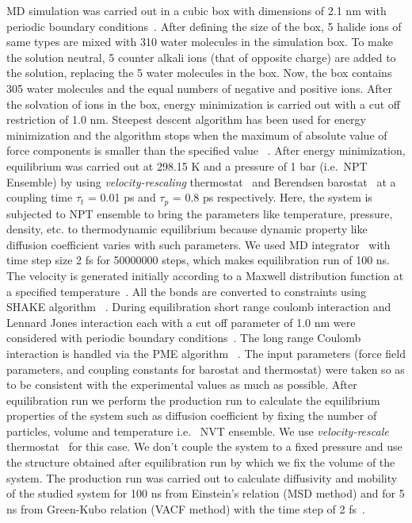 MD simulation was carried out in a cubic box with dimensions of 2.1 nm with periodic boundary 
conditions~\citep{Allen1989}. After defining the size of the box, 5 halide ions of same types are mixed with  310 water molecules in the  simulation box. To make the solution neutral, 5 counter alkali ions (that of opposite charge) are added to the solution, replacing the 5 water molecules in the box. Now, the box contains 305 water molecules and the equal numbers of negative and positive ions. After the solvation of ions in the box,  energy minimization is carried out with a cut off restriction of 1.0 nm.  Steepest descent algorithm has been used for energy minimization and the algorithm stops when the maximum of absolute value of force components is smaller than the specified value ~\citep{Gromacs-manual}. After energy minimization, equilibrium was carried out at  298.15 K and a pressure of 1 bar (i.e.~NPT Ensemble) by using \emph{velocity-rescaling} thermostat~\citep{bussi2007canonical} and Berendsen barostat~\citep{Berendsen1984} at a coupling time $\tau_t$ = 0.01 ps and $\tau_p$ = 0.8 ps respectively. Here, the system is subjected to NPT ensemble to bring the parameters like temperature, pressure, density, etc. to thermodynamic equilibrium because dynamic property like diffusion coefficient varies with such parameters. We used MD integrator~\citep{hockney1974quiet} with time step size 2 fs  for 50000000 steps, which makes equilibration run of 100 ns. The velocity is generated initially according to a Maxwell distribution function at a specified temperature~\citep{Gromacs-manual}. All the bonds are converted to constraints using SHAKE algorithm~ \citep{ryckaert1977numerical}. During equilibration short range coulomb interaction and Lennard Jones interaction each with a cut off parameter of 1.0 nm were considered  with periodic boundary conditions~\citep{Allen1989}. The long range Coulomb interaction is handled via the PME algorithm~ \citep{darden1993particle, essmann1995smooth}. The input parameters (force field parameters, and coupling constants for barostat and thermostat) were taken so as to be consistent with the experimental values as much as possible. After equilibration run we perform the production run to calculate the equilibrium properties of the system such as diffusion coefficient by fixing the number of particles, volume and temperature i.e.~ NVT ensemble. We use \emph{velocity-rescale} thermostat~ \citep{bussi2007canonical} for this case. We don't couple the system to a fixed pressure and use the structure obtained after equilibration run by which we fix the volume of the system. The production run was carried out to calculate diffusivity and mobility of the studied system for 100 ns  from Einstein's relation (MSD method) and for 5 ns from Green-Kubo relation (VACF method) with the time step of 2 fs~\citep{Frenkel2002}.

